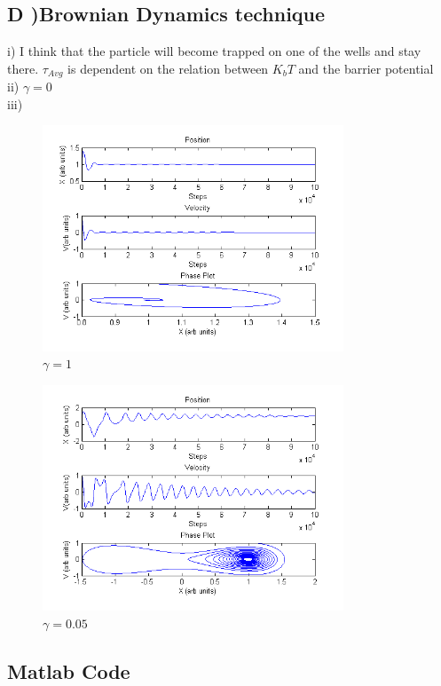 \documentclass[paper=a4, fontsize=12pt]{scrartcl} %
\numberwithin{equation}{section} %
\numberwithin{figure}{section} %
\numberwithin{table}{section} %
\begin{document}
\subsection*{\small{D )Brownian Dynamics technique}}
i) I think that the particle will become trapped on one of the wells and stay there. \(\tau_{Avg}\) is dependent on the relation between \(K_b T\) and the barrier potential\\
ii) \(\gamma = 0\)\\
iii) 
\begin{figure}[H]
  \centering
      \includegraphics[width=0.8\textwidth]{iii1.png}
  \caption{\(\gamma = 1\)}
\end{figure}
\begin{figure}[H]
  \centering
      \includegraphics[width=0.8\textwidth]{iii005.png}
  \caption{\(\gamma = 0.05\)}
\end{figure}

\subsection*{Matlab Code}



\end{document}
